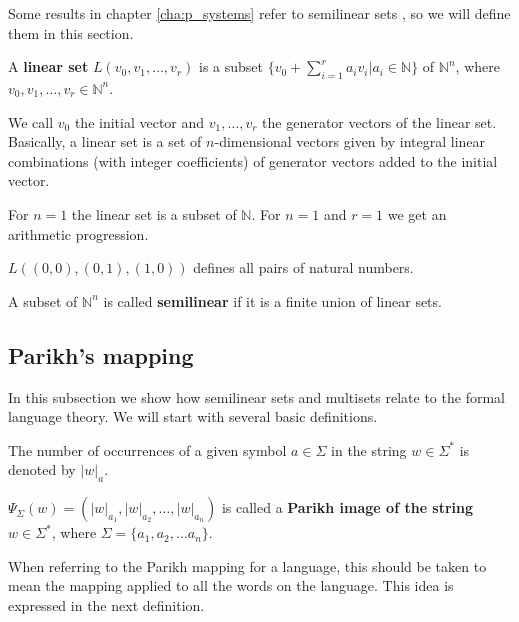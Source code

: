 Some results in chapter \ref{cha:p_systems} refer to semilinear sets \cite{Ibarra:03:Catalytic}, so we will define them in this section.
\begin{definition}
  A {\bf linear set} $L(v_0,v_1,\ldots,v_r)$ is a subset $\{v_0+\sum\limits_{i=1}^r a_iv_i|a_i\in\mathbb N\}$ of $\mathbb N^n$, where $v_0,v_1,\ldots,v_r\in \mathbb N^n$.
\end{definition}

We call $v_0$ the initial vector and $v_1,\ldots,v_r$ the generator vectors of the linear set. Basically, a linear set is a set of $n$-dimensional vectors given by integral linear combinations (with integer coefficients) of generator vectors added to the initial vector.

\begin{example}
  For $n=1$ the linear set is a subset of $\mathbb N$. For $n=1$ and $r=1$ we get an arithmetic progression.
\end{example}

\begin{example}
  $L((0,0),(0,1),(1,0))$ defines all pairs of natural numbers.
\end{example}

\begin{definition}
  A subset of $\mathbb N^n$ is called {\bf semilinear} if it is a finite union of linear sets.
\end{definition}

\subsection{Parikh's mapping} %
\label{sec:parikh_s_mapping}

In this subsection we show how semilinear sets and multisets relate to the formal language theory. We will start with several basic definitions.

The number of occurrences of a given symbol $a\in \Sigma$ in the string $w\in \Sigma^*$ is denoted by $|w|_a$.

\begin{definition}
$\Psi_\Sigma(w)=(|w|_{a_1},|w|_{a_2},\ldots,|w|_{a_n})$ is called a {\bf Parikh image of the string} $w\in \Sigma^*$, where $\Sigma=\{a_1,a_2,\ldots a_n\}$.
\end{definition}

When referring to the Parikh mapping for a language, this should be taken to mean the mapping applied to all the words on the language. This idea is expressed in the next definition. 

